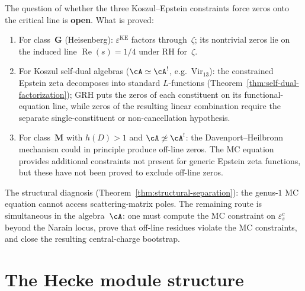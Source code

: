 \begin{remark}%
\label{rem:davenport-heilbronn-koszul-epstein}%
%
The question of whether the three Koszul--Epstein constraints
force zeros onto the critical line is \textbf{open}. What is proved:
\begin{enumerate}[label=\textup{(\arabic*)}]
\item
For class~$\mathbf{G}$ \textup{(}Heisenberg\textup{)}:
$\varepsilon^{\mathrm{KE}}$ factors through~$\zeta$;
its nontrivial zeros lie on the induced line
$\operatorname{Re}(s)=1/4$ under RH for~$\zeta$.
\item
For Koszul self-dual algebras \textup{(}$\cA \simeq \cA^!$,
e.g.\ $\mathrm{Vir}_{13}$\textup{)}:
the constrained Epstein zeta decomposes into standard
$L$-functions
\textup{(}Theorem~\textup{\ref{thm:self-dual-factorization}}\textup{)};
GRH puts the zeros of each constituent on its functional-equation
line, while zeros of the resulting linear combination require the
separate single-constituent or non-cancellation hypothesis.
\item
For class~$\mathbf{M}$ with $h(D) > 1$ and $\cA \not\simeq
\cA^!$: the Davenport--Heilbronn mechanism could in principle
produce off-line zeros.
The MC equation provides additional constraints not present
for generic Epstein zeta functions, but these have not been
proved to exclude off-line zeros.
\end{enumerate}
The structural diagnosis
\textup{(}Theorem~\textup{\ref{thm:structural-separation}}\textup{)}:
the genus-$1$ MC equation cannot access scattering-matrix
poles. The remaining route is simultaneous in the algebra~$\cA$:
one must compute the MC constraint on $\varepsilon^c_s$ beyond the
Narain locus, prove that off-line residues violate the MC constraints,
and close the resulting central-charge bootstrap.
\end{remark}

\section{The Hecke module structure}
\label{sec:recomputed-arithmetic-shadow}

